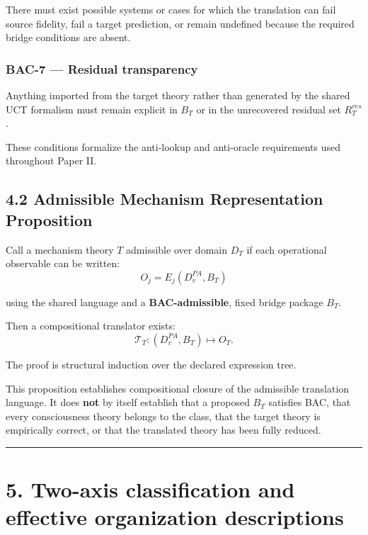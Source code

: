 \documentclass[
  11pt,
  a4paper,
]{article}
\begin{document}
There must exist possible systems or cases for which the translation can
fail source fidelity, fail a target prediction, or remain undefined
because the required bridge conditions are absent.

\hypertarget{bac-7-residual-transparency}{%
\subsubsection{BAC-7 --- Residual
transparency}\label{bac-7-residual-transparency}}

Anything imported from the target theory rather than generated by the
shared UCT formalism must remain explicit in \(B_T\) or in the
unrecovered residual set \(R_T^{res}\).

These conditions formalize the anti-lookup and anti-oracle requirements
used throughout Paper II.

\hypertarget{admissible-mechanism-representation-proposition}{%
\subsection{4.2 Admissible Mechanism Representation
Proposition}\label{admissible-mechanism-representation-proposition}}

Call a mechanism theory \(T\) admissible over domain \(D_T\) if each
operational observable can be written:
\nopagebreak[4]
\[
O_j
=
E_j(D^{PA}_v,B_T)
\]

using the shared language and a \textbf{BAC-admissible}, fixed bridge
package \(B_T\).

Then a compositional translator exists:
\nopagebreak[4]
\[
\mathcal T_T:
(D^{PA}_v,B_T)
\mapsto
O_T.
\]

The proof is structural induction over the declared expression tree.

This proposition establishes compositional closure of the admissible
translation language. It does \textbf{not} by itself establish that a
proposed \(B_T\) satisfies BAC, that every consciousness theory belongs
to the class, that the target theory is empirically correct, or that the
translated theory has been fully reduced.

\begin{center}\rule{0.5\linewidth}{0.5pt}\end{center}

\hypertarget{two-axis-classification-and-effective-organization-descriptions}{%
\section{5. Two-axis classification and effective organization
descriptions}\label{two-axis-classification-and-effective-organization-descriptions}}
\end{document}
